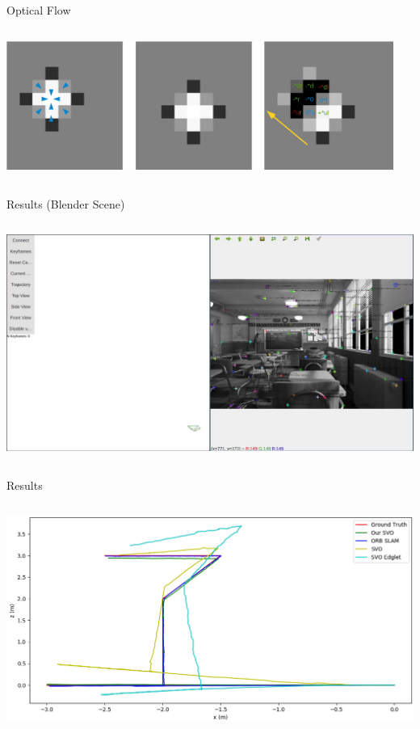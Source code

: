 \documentclass[aspectratio=169,12pt]{beamer}
\begin{document}
\begin{frame}{Optical Flow}
  \begin{columns}[c]
    \column{\dimexpr\paperwidth}
    \begin{center}
      \includegraphics[width=0.95\textwidth]{../img/optical_flow_2d.png}
    \end{center}
  \end{columns}
\end{frame}

\begin{frame}{Results (Blender Scene)}
  \vspace{-6pt}
  \begin{columns}[T]
    \column{\dimexpr\paperwidth}\centering
    \href{run:blender-classroom.mkv?autostart&loop}{\includegraphics[height=0.98\textheight]{out/blender-classroom.png}}
  \end{columns}
\end{frame}

\begin{frame}{Results}
  \begin{columns}[c]
    \column{\dimexpr\paperwidth}
    \begin{center}
      \includegraphics[height=0.9\textheight]{img/blender_classroom_simple_comp_top.png}
    \end{center}
  \end{columns}
\end{frame}
\end{document}
